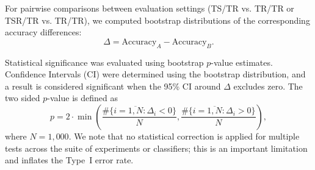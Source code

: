 For pairwise comparisons between evaluation settings (TS/TR vs. TR/TR or TSR/TR vs. TR/TR), we computed bootstrap distributions of the corresponding accuracy differences:
\[
\Delta = \mathrm{Accuracy}_{A} - \mathrm{Accuracy}_{B}.
\]

Statistical significance was evaluated using bootstrap $p$-value estimates. Confidence Intervals (CI) were determined using the bootstrap distribution, and a result is considered significant when the 95\% CI around $\Delta$ excludes zero. The two sided $p$-value is defined as \[p = 2 \cdot \min\!\left(\frac{\# \{ i = \overline{1, N} : \Delta_i<0\}}{N},\frac{\#\{i = \overline{1, N} :\Delta_i>0\}}{N}\right),\] where $N = 1,000$. We note that no statistical correction is applied for multiple tests across the suite of experiments or classifiers; this is an important limitation and inflates the Type~I error rate.

